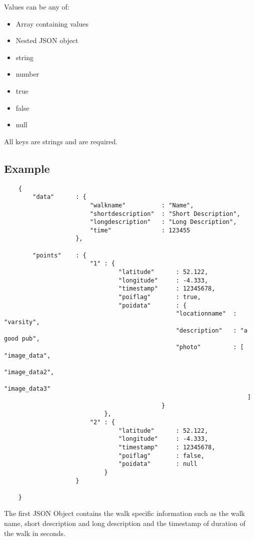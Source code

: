 \documentclass{project}
\begin{document}
Values can be any of:
\begin{itemize}
\item Array containing values
\item Nested JSON object
\item string
\item number
\item true
\item false
\item null
\end{itemize}

All keys are strings and are required.

\subsection{Example}

\begin{verbatim}
	{
    	"data" 		: {
                        "walkname"			: "Name",
                    	"shortdescription"	: "Short Description",
                    	"longdescription"	: "Long Description",
                    	"time"				: 123455
                 	},
   		
        "points"	: {
        				"1" : {
                                "latitude"		: 52.122,
                                "longitude"		: -4.333,
                                "timestamp"		: 12345678,
                                "poiflag"		: true,
                                "poidata"		: {
                                                "locationname"	: "varsity",
                                                "description"	: "a good pub",
                                                "photo"			: [ "image_data",
                                                					"image_data2",
                                                                    "image_data3"
                                                                    ]
                                			}
                        	},
                     	"2" : {
                                "latitude"		: 52.122,
                                "longitude"		: -4.333,
                                "timestamp"		: 12345678,
                                "poiflag"		: false,
                                "poidata"		: null
                        	}
        			}
    
    }

\end{verbatim}

The first JSON Object contains the walk specific information such as the walk name, short description and long description and the timestamp of duration of the walk in seconds.
\end{document}
